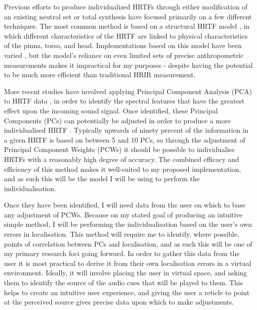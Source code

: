\documentclass[10pt, oneside, a4paper, draft]{scrartcl}
\begin{document}
Previous efforts to produce individualized HRTFs through either modification of an existing neutral set or total synthesis have focused primarily on a few different techniques. The most common method is based on a structural HRTF model \cite{PhillipBrown1998, Raykar2003}, in which different characteristics of the HRTF are linked to physical characteristics of the pinna, torso, and head. Implementations based on this model have been varied \cite{Tashev2014, Xu2007, DmitryN.ZotkinJaneHwangRamaniDuraiswami2003}, but the model's reliance on even limited sets of precise anthropometric measurements makes it impractical for my purposes - despite having the potential to be much more efficient than traditional HRIR measurement. 

More recent studies have involved applying Principal Component Analysis (PCA) to HRTF data \cite{Holzl2012a}, in order to identify the spectral features that have the greatest effect upon the incoming sound signal. Once identified, these Principal Components (PCs) can potentially be adjusted in order to produce a more individualised HRTF \cite{Fink2012,Holzl2014a}. Typically upwards of ninety percent of the information in a given HRTF is based on between 5 and 10 PCs\cite{???}, so through the adjustment of Principal Component Weights (PCWs) it should be possible to individualise HRTFs with a reasonably high degree of accuracy. The combined efficacy and efficiency of this method makes it well-suited to my proposed implementation, and as such this will be the model I will be using to perform the individualisation. 

Once they have been identified, I will need data from the user on which to base any adjustment of PCWs. Because on my stated goal of producing an intuitive simple method, I will be performing the individualisation based on the user's own errors in localisation. This method will require me to identify, where possible, points of correlation between PCs and localisation, and as such this will be one of my primary research foci going forward. In order to gather this data from the user it is most practical to derive it from their own localisation errors in a virtual environment. Ideally, it will involve placing the user in virtual space, and asking them to identify the source of the audio cues that will be played to them. This helps to create an intuitive user experience, and giving the user a reticle to point at the perceived source gives precise data upon which to make adjustments. 

\end{document}
